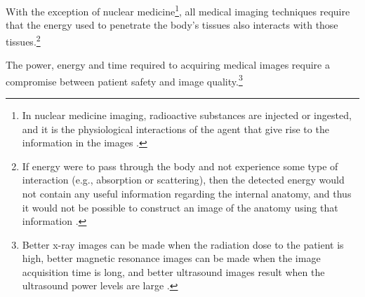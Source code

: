 
With the exception of nuclear medicine\footnote{In nuclear medicine
  imaging, radioactive substances are injected or ingested, and it is
  the physiological interactions of the agent that give rise to the
  information in the images \cite{bushberg2011essential}.}, all
medical imaging techniques require that the energy used to penetrate
the body’s tissues also interacts with those tissues.\footnote{If
  energy were to pass through the body and not experience some type of
  interaction (e.g., absorption or scattering), then the detected
  energy would not contain any useful information regarding the
  internal anatomy, and thus it would not be possible to construct an
  image of the anatomy using that information
  \cite{bushberg2011essential}.}

The power, energy and time required to acquiring medical images
require a compromise between patient safety and image
quality.\footnote{Better x-ray images can be made when the radiation
  dose to the patient is high, better magnetic resonance images can be
  made when the image acquisition time is long, and better ultrasound
  images result when the ultrasound power levels are large
  \cite{bushberg2011essential}.}

